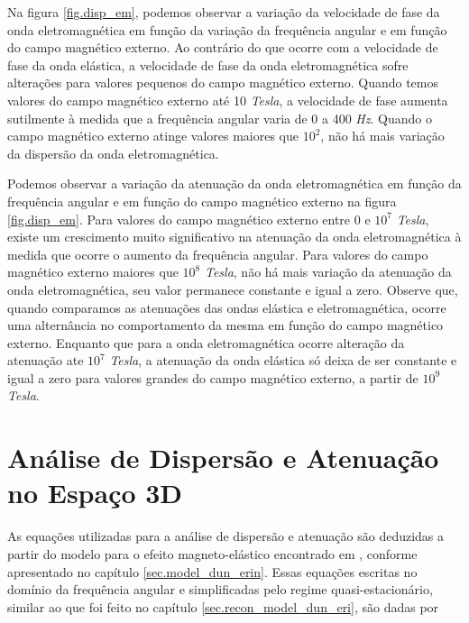 Na figura \ref{fig.disp_em}, podemos observar a varia\c{c}\~ao da velocidade de fase da onda eletromagn\'etica em fun\c{c}\~ao da varia\c{c}\~ao da frequ\^encia angular e em fun\c{c}\~ao do campo magn\'etico externo. Ao contr\'ario do que ocorre com a velocidade de fase da onda el\'astica, a velocidade de fase da onda eletromagn\'etica sofre altera\c{c}\~oes para valores pequenos do campo magn\'etico externo. Quando temos valores do campo magn\'etico externo at\'e 10 \textit{Tesla}, a velocidade de fase aumenta sutilmente \`a medida que a frequ\^encia angular varia de 0 a 400 \textit{Hz}. Quando o campo magn\'etico externo atinge valores maiores que $10^2$, n\~ao h\'a mais varia\c{c}\~ao da dispers\~ao da onda eletromagn\'etica.


Podemos observar a varia\c{c}\~ao da atenua\c{c}\~ao da onda eletromagn\'etica em fun\c{c}\~ao da frequ\^encia angular e em fun\c{c}\~ao do campo magn\'etico externo na figura \ref{fig.disp_em}. Para valores do campo magn\'etico externo entre 0 e $10^7$ \textit{Tesla}, existe um crescimento muito significativo na atenua\c{c}\~ao da onda eletromagn\'etica \`a medida que ocorre o aumento da frequ\^encia angular. Para valores do campo magn\'etico externo maiores que $10^8$ \textit{Tesla}, n\~ao h\'a mais varia\c{c}\~ao da atenua\c{c}\~ao da onda eletromagn\'etica, seu valor permanece constante e igual a zero. Observe que, quando comparamos as atenua\c{c}\~oes das ondas el\'astica e eletromagn\'etica, ocorre uma altern\^ancia no comportamento da mesma em fun\c{c}\~ao do campo magn\'etico externo. Enquanto que para a onda eletromagn\'etica ocorre altera\c{c}\~ao da atenua\c{c}\~ao ate $10^7$ \textit{Tesla}, a atenua\c{c}\~ao da onda el\'astica s\'o deixa de ser constante e igual a zero para valores grandes do campo magn\'etico externo, a partir de $10^9$ \textit{Tesla}. 


\section{An\'alise de Dispers\~ao e Atenua\c{c}\~ao no Espa\c{c}o 3D}

As equa\c{c}\~oes utilizadas para a an\'alise de dispers\~ao e atenua\c{c}\~ao s\~ao deduzidas a partir do modelo para o efeito magneto-el\'astico encontrado em \cite{eringen_1963}, conforme apresentado no cap\'itulo \ref{sec.model_dun_erin}. Essas equa\c{c}\~oes escritas no dom\'inio da frequ\^encia angular e simplificadas pelo regime quasi-estacion\'ario, similar ao que foi feito no cap\'itulo \ref{sec.recon_model_dun_eri}, s\~ao dadas por 


